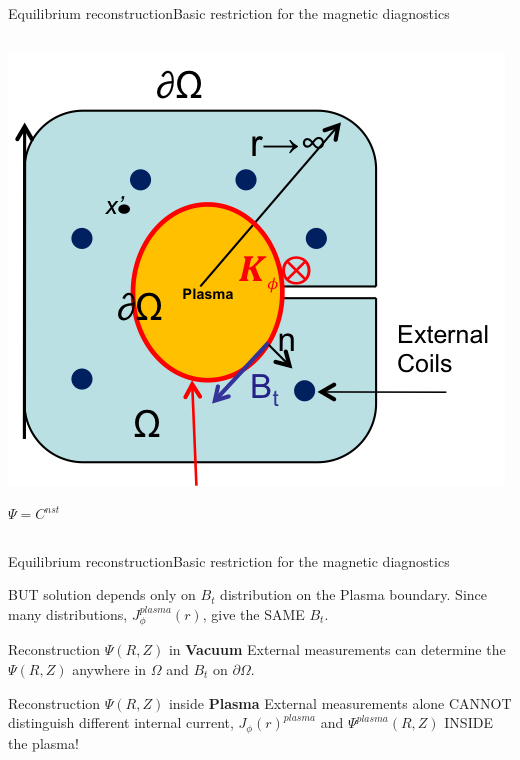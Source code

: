 \documentclass{beamer}
\begin{document}
\begin{frame}{Equilibrium reconstruction}{Basic restriction for  the magnetic diagnostics }
\begin{columns}
   \begin{center}
 	\includegraphics[trim = 1mm 1mm 8mm 1mm, clip, width=.7\columnwidth]{xsection2.png}

	{ \color{red}   $ \Psi = C^{nst}$  }
   \end{center}
 \end{columns}

 \visible<3->{ \begin{block}{}%
Term 3 is the only one that depends on internal current, $J_{\phi}^{plasma}$.
\end{block}
}
 \end{frame}

 \begin{frame}{Equilibrium reconstruction}{Basic restriction for  the magnetic diagnostics }
 \begin{block}{}
BUT solution depends only on $B_t$ distribution on the Plasma boundary.
Since many distributions, $J_\phi^{plasma}(r)$, give the SAME  $B_t$.
\end{block}

 \begin{block}{Reconstruction $\Psi(R,Z)$ in \textbf{Vacuum}  \smiley }
 {
		External  measurements can determine the $\Psi(R,Z)$ anywhere in $\Omega$  and  $B_t$  on
	$\partial  \Omega$. ~~~  \smiley
}
\end{block}

 \begin{block}{Reconstruction $\Psi(R,Z)$ inside  \textbf{Plasma} \frownie  }
 {\color<2->{red}
	External  measurements alone  CANNOT distinguish  different internal current,
	$J_\phi(r)^{plasma}$ and $\Psi^{plasma}(R,Z)$ INSIDE the plasma! \frownie
}
\end{block}
\end{frame}
\end{document}
